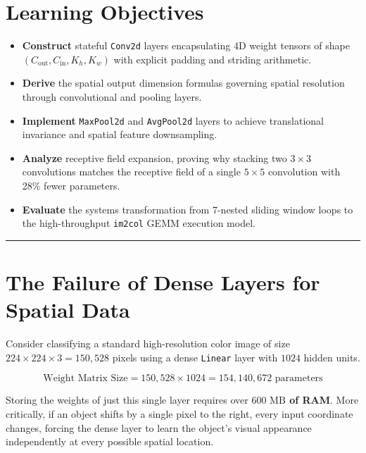 \documentclass[
  letterpaper,
]{scrbook}
\providecommand{\tightlist}{%
  \setlength{\itemsep}{0pt}\setlength{\parskip}{0pt}}
\begin{document}
\section{Learning Objectives}\label{learning-objectives-9}

\begin{itemize}
\tightlist
\item
  \textbf{Construct} stateful \texttt{Conv2d} layers encapsulating 4D
  weight tensors of shape \((C_{\text{out}}, C_{\text{in}}, K_h, K_w)\)
  with explicit padding and striding arithmetic.
\item
  \textbf{Derive} the spatial output dimension formulas governing
  spatial resolution through convolutional and pooling layers.
\item
  \textbf{Implement} \texttt{MaxPool2d} and \texttt{AvgPool2d} layers to
  achieve translational invariance and spatial feature downsampling.
\item
  \textbf{Analyze} receptive field expansion, proving why stacking two
  \(3 \times 3\) convolutions matches the receptive field of a single
  \(5 \times 5\) convolution with 28\% fewer parameters.
\item
  \textbf{Evaluate} the systems transformation from 7-nested sliding
  window loops to the high-throughput \texttt{im2col} GEMM execution
  model.
\end{itemize}

\begin{center}\rule{0.5\linewidth}{0.5pt}\end{center}

\section{The Failure of Dense Layers for Spatial
Data}\label{the-failure-of-dense-layers-for-spatial-data}

Consider classifying a standard high-resolution color image of size
\(224 \times 224 \times 3 = 150,528\) pixels using a dense
\texttt{Linear} layer with \(1024\) hidden units.

\[\text{Weight Matrix Size} = 150,528 \times 1024 = 154,140,672\text{ parameters}\]

Storing the weights of just this single layer requires over
\textbf{\(600\text{ MB}\) of RAM}. More critically, if an object shifts
by a single pixel to the right, every input coordinate changes, forcing
the dense layer to learn the object's visual appearance independently at
every possible spatial location.
\end{document}
